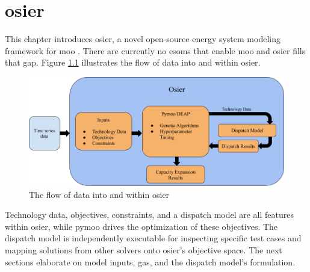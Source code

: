 \chapter{\acf{osier}}
\label{chapter:osier}

This chapter introduces \acf{osier}, a novel open-source energy system modeling
framework for \acl{moo} \cite{dotson_osier_2024}. There are currently no
\acp{esom} that enable \ac{moo} and \ac{osier} fills that gap. Figure 
\ref{fig:osier_flow} illustrates the flow of data into and within \ac{osier}.

\begin{figure}[H]
    \centering
    \includegraphics[width=\columnwidth]{figures/osier_flow}
    \caption{The flow of data into and within \ac{osier}}
    \label{fig:osier_flow}
\end{figure}

Technology data, objectives, constraints, and a dispatch model are all features
within \ac{osier}, while \ac{pymoo} drives the optimization of these objectives.
The dispatch model is independently executable for inspecting specific test
cases and mapping solutions from other solvers onto \ac{osier}'s objective
space. The next sections elaborate on model inputs, \acfp{ga}, and the dispatch model's 
formulation.






